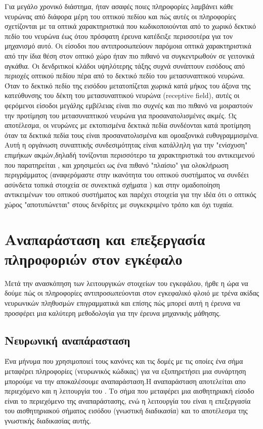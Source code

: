 \documentclass[12pt]{report}
\begin{document}
Για μεγάλο χρονικό διάστημα, ήταν ασαφές ποιες πληροφορίες λαμβάνει κάθε νευρώνας από διάφορα μέρη του οπτικού πεδίου και πώς αυτές οι πληροφορίες σχετίζονται με τα οπτικά χαρακτηριστικά που κωδικοποιούνται από το χωρικό δεκτικό πεδίο του νευρώνα έως ότου πρόσφατη έρευνα κατέδειξε περισσοτέρα για τον μηχανισμό αυτό. Οι είσοδοι που αντιπροσωπεύουν παρόμοια οπτικά χαρακτηριστικά από την ίδια θέση στον οπτικό χώρο ήταν πιο πιθανό να συγκεντρωθούν σε γειτονικά αγκάθια. Οι δενδριτικοί κλάδοι υψηλότερης τάξης συχνά συνάπτουν εισόδους από περιοχές οπτικού πεδίου πέρα από το δεκτικό πεδίο του μετασυναπτικού νευρώνα. Όταν το δεκτικό πεδίο της εισόδου μετατοπίζεται χωρικά κατά μήκος του άξονα της κατεύθυνσης του δέκτη του μετασυναπτικού νευρώνα (\textlatin{receptive field}), αυτές οι φερόμενοι είσοδοι μεγάλης εμβέλειας είναι πιο συχνές και πιο πιθανό να μοιραστούν την προτίμηση του μετασυναπτικού νευρώνα για προσανατολισμένες ακμές. Ως αποτέλεσμα, οι νευρώνες με εκτοπισμένα δεκτικά πεδία συνδέονται κατά προτίμηση όταν τα δεκτικά πεδία τους είναι προσανατολισμένα και ομοαξονικά ευθυγραμμισμένα. Αυτή η οργάνωση συναπτικής συνδεσιμότητας είναι κατάλληλη για την "ενίσχυση" επιμήκων ακμών,δηλαδή τονίζονται περισσότερο τα χαρακτηριστικά του αντικειμενού που παρατηρείται , και χρησιμεύει ως ένα πιθανό "πλαίσιο" για ολοκλήρωση περιγράμματος (αναφερόμαστε στην ικανότητα του οπτικού συστήματος να συνδέει ασύνδετα τοπικά στοιχεία σε συνεκτικά σχήματα \cite{persike2016}) και στην ομαδοποίηση αντικειμένων του οπτικού συστήματος \cite{Iacaruso2017} και παρέχει στοιχεία για την ιδέα ότι ο οπτικός χώρος "αποτυπώνεται" στους δενδρίτες με συγκεκριμένο τρόπο και όχι τυχαία.


\section{Αναπαράσταση και επεξεργασία πληροφοριών στον εγκέφαλο}
Μετά την ανασκόπηση των λειτουργικών στοιχείων του εγκεφάλου, ήρθε η ώρα να δούμε πώς οι πληροφορίες αντιπροσωπεύονται στον εγκεφαλικό φλοιό με τρένα ακίδας νευρωνικών πληθυσμών επιγραμματικά και επίσης πώς μπορεί αυτή η έρευνα να προσφέρει μια καλύτερη μεθοδολογία για την έρευνα μηχανικής μάθησης. 
\subsection{Νευρωνική αναπάρασταση}

Ένα μήνυμα που χρησιμοποιεί τους κανόνες και τις δομές με τις οποίες ένα σήμα μεταφέρει πληροφορίες (νευρωνικός κώδικας) για να εξυπηρετήσει μια συνάρτηση μπορούμε να την αποκαλέσουμε αναπαράσταση.Η αναπαράσταση αποτελείται απο περιεχόμενο και η λειτουργία του . Το σήμα που μεταφέρει μια αισθητηριακή είσοδο είναι το περιεχόμενο της αναπαράστασης, ενώ η λειτουργία του είναι η επεξεργασία του αισθητηριακού σήματος εισόδου (γνωστική διαδικασία) και το αποτέλεσμα της γνωστικής διαδικασίας αυτής.
\end{document}
